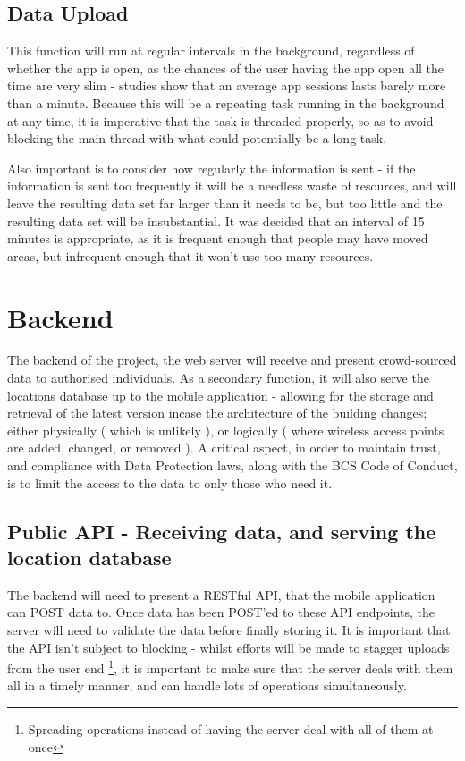 \documentclass[11pt]{informatics-report}
\begin{document}
\subsection{Data Upload}

This function will run at regular intervals in the background, regardless of whether the app is open, as the chances of the user having the app open all the time are very slim - studies show that an average app sessions lasts barely more than a minute\cite{Bohmer:2011:FAA:2037373.2037383}. Because this will be a repeating task running in the background at any time, it is imperative that the task is threaded properly, so as to avoid blocking the main thread with what could potentially be a long task. 

Also important is to consider how regularly the information is sent - if the information is sent too frequently it will be a needless waste of resources, and will leave the resulting data set far larger than it needs to be, but too little and the resulting data set will be insubstantial. It was decided that an interval of 15 minutes is appropriate, as it is frequent enough that people may have moved areas, but infrequent enough that it won't use too many resources.

\section{Backend}

The backend of the project, the web server will receive and present crowd-sourced data to authorised individuals. As a secondary function, it will also serve the locations database up to the mobile application - allowing for the storage and retrieval of the latest version incase the architecture of the building changes; either physically ( which is unlikely ), or logically ( where wireless access points are added, changed, or removed ). A critical aspect, in order to maintain trust, and compliance with Data Protection laws, along with the BCS Code of Conduct, is to limit the access to the data to only those who need it.


\subsection{Public API - Receiving data, and serving the location database}

The backend will need to present a RESTful API, that the mobile application can POST data to. Once data has been POST'ed to these API endpoints, the server will need to validate the data before finally storing it. It is important that the API isn't subject to blocking - whilst efforts will be made to stagger uploads from the user end \footnote{Spreading operations instead of having the server deal with all of them at once}, it is important to make sure that the server deals with them all in a timely manner, and can handle lots of operations simultaneously.
\end{document}
